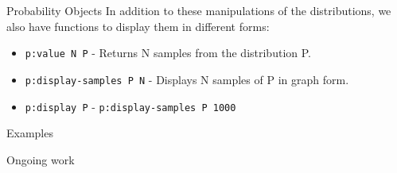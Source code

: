 \documentclass[14pt]{beamer}
\begin{document}
\begin{frame}{Probability Objects}
  In addition to these manipulations of the distributions, we also have
  functions to display them in different forms:\\
  \begin{itemize}
    \item \texttt{p:value N P} - Returns N samples from the distribution P.
    \item \texttt{p:display-samples P N} - Displays N samples of P in graph form.
    \item \texttt{p:display P} - \texttt{p:display-samples P 1000}
  \end{itemize}
\end{frame}

\begin{frame}{Examples}
  
\end{frame}

\begin{frame}{Ongoing work}
  
\end{frame}
\end{document}
